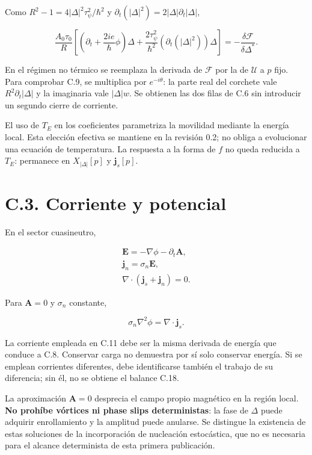 \documentclass[
  spanish,
  10pt,
  a4paper,
]{article}
\begin{document}
Como \(R^2-1=4|\Delta|^2\tau_\psi^2/\hbar^2\) y
\(\partial_t(|\Delta|^2)=2|\Delta|\partial_t|\Delta|\),

\[
\frac{A_0\tau_0}{R}\left[
\left(\partial_t+\frac{2ie}{\hbar}\phi\right)\Delta
+\frac{2\tau_\psi^2}{\hbar^2}(\partial_t(|\Delta|^2))\Delta\right]
=-\frac{\delta\mathcal F}{\delta\Delta^*}. \tag{C.9}
\]

En el régimen no térmico se reemplaza la derivada de \(\mathcal F\) por
la de \(\mathcal U\) a \(p\) fijo. Para comprobar C.9, se multiplica por
\(e^{-i\theta}\): la parte real del corchete vale
\(R^2\partial_t|\Delta|\) y la imaginaria vale \(|\Delta|w\). Se
obtienen las dos filas de C.6 sin introducir un segundo cierre de
corriente.

El uso de \(T_E\) en los coeficientes parametriza la movilidad mediante
la energía local. Esta elección efectiva se mantiene en la revisión 0.2;
no obliga a evolucionar una ecuación de temperatura. La respuesta a la
forma de \(f\) no queda reducida a \(T_E\): permanece en
\(X_{|\Delta|}[p]\) y \(\mathbf j_s[p]\).

\section{C.3. Corriente y potencial}\label{c.3.-corriente-y-potencial}

En el sector cuasineutro,

\[
\begin{gathered}
\mathbf E=-\nabla\phi-\partial_t\mathbf A,\\
\mathbf j_n=\sigma_n\mathbf E,\\
\nabla\cdot(\mathbf j_s+\mathbf j_n)=0.
\end{gathered} \tag{C.10}
\]

Para \(\mathbf A=0\) y \(\sigma_n\) constante,

\[
\sigma_n\nabla^2\phi=\nabla\cdot\mathbf j_s. \tag{C.11}
\]

La corriente empleada en C.11 debe ser la misma derivada de energía que
conduce a C.8. Conservar carga no demuestra por sí solo conservar
energía. Si se emplean corrientes diferentes, debe identificarse también
el trabajo de su diferencia; sin él, no se obtiene el balance C.18.

La aproximación \(\mathbf A=0\) desprecia el campo propio magnético en
la región local. \textbf{No prohíbe vórtices ni phase slips
deterministas}: la fase de \(\Delta\) puede adquirir enrollamiento y la
amplitud puede anularse. Se distingue la existencia de estas soluciones
de la incorporación de nucleación estocástica, que no es necesaria para
el alcance determinista de esta primera publicación.
\end{document}
